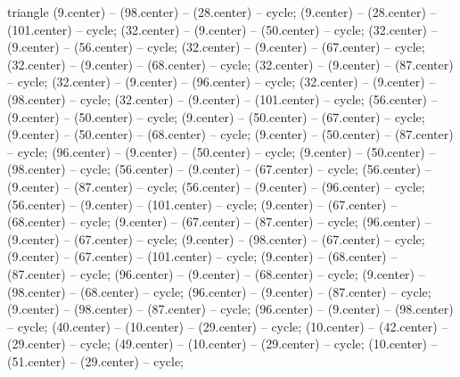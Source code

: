 \begin{pgfonlayer}{triangle}
 (9.center) -- (98.center) -- (28.center) -- cycle; 
 (9.center) -- (28.center) -- (101.center) -- cycle; 
 (32.center) -- (9.center) -- (50.center) -- cycle; 
 (32.center) -- (9.center) -- (56.center) -- cycle; 
 (32.center) -- (9.center) -- (67.center) -- cycle; 
 (32.center) -- (9.center) -- (68.center) -- cycle; 
 (32.center) -- (9.center) -- (87.center) -- cycle; 
 (32.center) -- (9.center) -- (96.center) -- cycle; 
 (32.center) -- (9.center) -- (98.center) -- cycle; 
 (32.center) -- (9.center) -- (101.center) -- cycle; 
 (56.center) -- (9.center) -- (50.center) -- cycle; 
 (9.center) -- (50.center) -- (67.center) -- cycle; 
 (9.center) -- (50.center) -- (68.center) -- cycle; 
 (9.center) -- (50.center) -- (87.center) -- cycle; 
 (96.center) -- (9.center) -- (50.center) -- cycle; 
 (9.center) -- (50.center) -- (98.center) -- cycle; 
 (56.center) -- (9.center) -- (67.center) -- cycle; 
 (56.center) -- (9.center) -- (87.center) -- cycle; 
 (56.center) -- (9.center) -- (96.center) -- cycle; 
 (56.center) -- (9.center) -- (101.center) -- cycle; 
 (9.center) -- (67.center) -- (68.center) -- cycle; 
 (9.center) -- (67.center) -- (87.center) -- cycle; 
 (96.center) -- (9.center) -- (67.center) -- cycle; 
 (9.center) -- (98.center) -- (67.center) -- cycle; 
 (9.center) -- (67.center) -- (101.center) -- cycle; 
 (9.center) -- (68.center) -- (87.center) -- cycle; 
 (96.center) -- (9.center) -- (68.center) -- cycle; 
 (9.center) -- (98.center) -- (68.center) -- cycle; 
 (96.center) -- (9.center) -- (87.center) -- cycle; 
 (9.center) -- (98.center) -- (87.center) -- cycle; 
 (96.center) -- (9.center) -- (98.center) -- cycle; 
 (40.center) -- (10.center) -- (29.center) -- cycle; 
 (10.center) -- (42.center) -- (29.center) -- cycle; 
 (49.center) -- (10.center) -- (29.center) -- cycle; 
 (10.center) -- (51.center) -- (29.center) -- cycle; 

\end{pgfonlayer}
